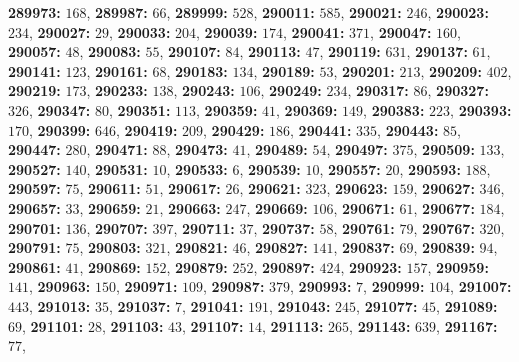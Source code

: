 \textsf{\bfseries 289973:} $168$, \textsf{\bfseries 289987:} $66$, \textsf{\bfseries 289999:} $528$, \textsf{\bfseries 290011:} $585$, \textsf{\bfseries 290021:} $246$, \textsf{\bfseries 290023:} $234$, \textsf{\bfseries 290027:} $29$, \textsf{\bfseries 290033:} $204$, \textsf{\bfseries 290039:} $174$, \textsf{\bfseries 290041:} $371$, \textsf{\bfseries 290047:} $160$, \textsf{\bfseries 290057:} $48$, \textsf{\bfseries 290083:} $55$, \textsf{\bfseries 290107:} $84$, \textsf{\bfseries 290113:} $47$, \textsf{\bfseries 290119:} $631$, \textsf{\bfseries 290137:} $61$, \textsf{\bfseries 290141:} $123$, \textsf{\bfseries 290161:} $68$, \textsf{\bfseries 290183:} $134$, \textsf{\bfseries 290189:} $53$, \textsf{\bfseries 290201:} $213$, \textsf{\bfseries 290209:} $402$, \textsf{\bfseries 290219:} $173$, \textsf{\bfseries 290233:} $138$, \textsf{\bfseries 290243:} $106$, \textsf{\bfseries 290249:} $234$, \textsf{\bfseries 290317:} $86$, \textsf{\bfseries 290327:} $326$, \textsf{\bfseries 290347:} $80$, \textsf{\bfseries 290351:} $113$, \textsf{\bfseries 290359:} $41$, \textsf{\bfseries 290369:} $149$, \textsf{\bfseries 290383:} $223$, \textsf{\bfseries 290393:} $170$, \textsf{\bfseries 290399:} $646$, \textsf{\bfseries 290419:} $209$, \textsf{\bfseries 290429:} $186$, \textsf{\bfseries 290441:} $335$, \textsf{\bfseries 290443:} $85$, \textsf{\bfseries 290447:} $280$, \textsf{\bfseries 290471:} $88$, \textsf{\bfseries 290473:} $41$, \textsf{\bfseries 290489:} $54$, \textsf{\bfseries 290497:} $375$, \textsf{\bfseries 290509:} $133$, \textsf{\bfseries 290527:} $140$, \textsf{\bfseries 290531:} $10$, \textsf{\bfseries 290533:} $6$, \textsf{\bfseries 290539:} $10$, \textsf{\bfseries 290557:} $20$, \textsf{\bfseries 290593:} $188$, \textsf{\bfseries 290597:} $75$, \textsf{\bfseries 290611:} $51$, \textsf{\bfseries 290617:} $26$, \textsf{\bfseries 290621:} $323$, \textsf{\bfseries 290623:} $159$, \textsf{\bfseries 290627:} $346$, \textsf{\bfseries 290657:} $33$, \textsf{\bfseries 290659:} $21$, \textsf{\bfseries 290663:} $247$, \textsf{\bfseries 290669:} $106$, \textsf{\bfseries 290671:} $61$, \textsf{\bfseries 290677:} $184$, \textsf{\bfseries 290701:} $136$, \textsf{\bfseries 290707:} $397$, \textsf{\bfseries 290711:} $37$, \textsf{\bfseries 290737:} $58$, \textsf{\bfseries 290761:} $79$, \textsf{\bfseries 290767:} $320$, \textsf{\bfseries 290791:} $75$, \textsf{\bfseries 290803:} $321$, \textsf{\bfseries 290821:} $46$, \textsf{\bfseries 290827:} $141$, \textsf{\bfseries 290837:} $69$, \textsf{\bfseries 290839:} $94$, \textsf{\bfseries 290861:} $41$, \textsf{\bfseries 290869:} $152$, \textsf{\bfseries 290879:} $252$, \textsf{\bfseries 290897:} $424$, \textsf{\bfseries 290923:} $157$, \textsf{\bfseries 290959:} $141$, \textsf{\bfseries 290963:} $150$, \textsf{\bfseries 290971:} $109$, \textsf{\bfseries 290987:} $379$, \textsf{\bfseries 290993:} $7$, \textsf{\bfseries 290999:} $104$, \textsf{\bfseries 291007:} $443$, \textsf{\bfseries 291013:} $35$, \textsf{\bfseries 291037:} $7$, \textsf{\bfseries 291041:} $191$, \textsf{\bfseries 291043:} $245$, \textsf{\bfseries 291077:} $45$, \textsf{\bfseries 291089:} $69$, \textsf{\bfseries 291101:} $28$, \textsf{\bfseries 291103:} $43$, \textsf{\bfseries 291107:} $14$, \textsf{\bfseries 291113:} $265$, \textsf{\bfseries 291143:} $639$, \textsf{\bfseries 291167:} $77$, 
